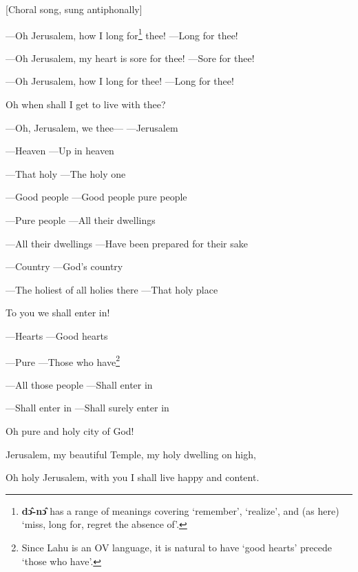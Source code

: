 \setcounter{footnote}{0}

[Choral song, sung antiphonally]

---Oh Jerusalem, how I long for\footnote{\textbf{dɔ̂-nɔ̂} has a range of meanings covering `remember', `realize', and (as here) `miss, long for, regret the absence of'.} thee! ---Long for thee!

---Oh Jerusalem, my heart is sore for thee! ---Sore for thee!

---Oh Jerusalem, how I long for thee! ---Long for thee!

Oh when shall I get to live with thee?

---Oh, Jerusalem, we thee--- ---Jerusalem

---Heaven ---Up in heaven

---That holy ---The holy one

---Good people ---Good people pure people

---Pure people ---All their dwellings

---All their dwellings ---Have been prepared for their sake

---Country ---God's country

---The holiest of all holies there ---That holy place

To you we shall enter in!

---Hearts ---Good hearts

---Pure ---Those who have\footnote{Since Lahu is an OV language, it is natural to have `good hearts' precede `those who have'.}

---All those people ---Shall enter in

---Shall enter in ---Shall surely enter in

Oh pure and holy city of God!

Jerusalem, my beautiful Temple, my holy dwelling on high,

Oh holy Jerusalem, with you I shall live happy and content.


